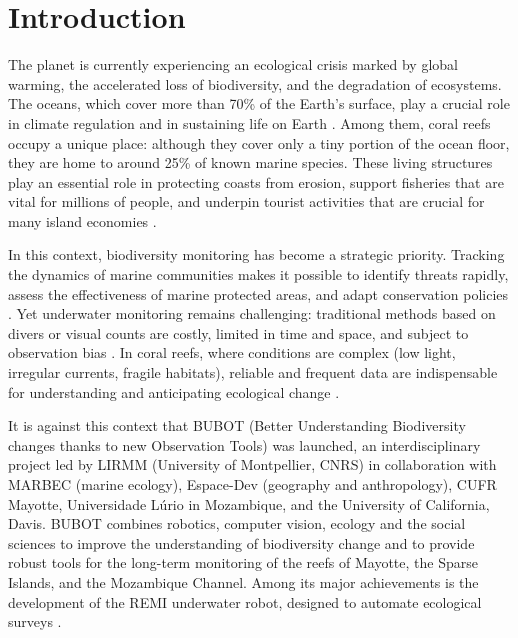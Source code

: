 \resetgraphicspath
{}

\chapter{Introduction}
\label{chap:introduction}
The planet is currently experiencing an ecological crisis marked by global warming, the accelerated loss of biodiversity, and the degradation of ecosystems. The oceans, which cover more than 70\% of the Earth's surface, play a crucial role in climate regulation and in sustaining life on Earth \cite{Pendleton2020,Visbeck2018}. Among them, coral reefs occupy a unique place: although they cover only a tiny portion of the ocean floor, they are home to around 25\% of known marine species. These living structures play an essential role in protecting coasts from erosion, support fisheries that are vital for millions of people, and underpin tourist activities that are crucial for many island economies \cite{Ferrario2014,Spalding2017,Plaisance2011}.

In this context, biodiversity monitoring has become a strategic priority. Tracking the dynamics of marine communities makes it possible to identify threats rapidly, assess the effectiveness of marine protected areas, and adapt conservation policies \cite{HoeghGuldberg2017,Yuan2024}. Yet underwater monitoring remains challenging: traditional methods based on divers or visual counts are costly, limited in time and space, and subject to observation bias \cite{Edgar2004}. In coral reefs, where conditions are complex (low light, irregular currents, fragile habitats), reliable and frequent data are indispensable for understanding and anticipating ecological change \cite{Maslin2021}.

It is against this context that BUBOT (Better Understanding Biodiversity changes thanks to new Observation Tools) was launched, an interdisciplinary project led by LIRMM (University of Montpellier, CNRS) in collaboration with MARBEC (marine ecology), Espace-Dev (geography and anthropology), CUFR Mayotte, Universidade Lúrio in Mozambique, and the University of California, Davis. BUBOT combines robotics, computer vision, ecology and the social sciences to improve the understanding of biodiversity change and to provide robust tools for the long-term monitoring of the reefs of Mayotte, the Sparse Islands, and the Mozambique Channel. Among its major achievements is the development of the REMI underwater robot, designed to automate ecological surveys \cite{Hereau2020}.

